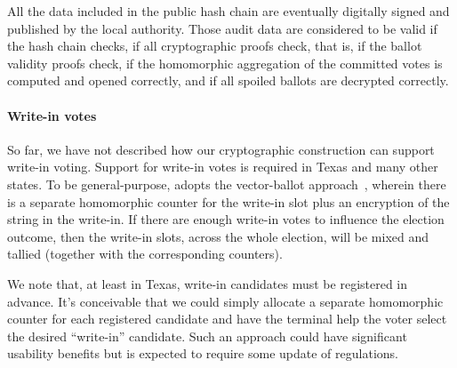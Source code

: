 All the data included in the public hash chain are eventually
digitally signed and published by the local authority. Those audit
data are considered to be valid if the hash chain checks, if all
cryptographic proofs check, that is, if the ballot validity proofs
check, if the homomorphic aggregation of the committed votes is
computed and opened correctly, and if all spoiled ballots are
decrypted correctly.

\paragraph{Write-in votes}
So far, we have not described how our cryptographic construction can
support write-in voting. Support for write-in votes is required in
Texas and many other states. To be general-purpose, \projname adopts
the vector-ballot approach~\cite{kiayias04vectorBallot}, wherein there
is a separate homomorphic counter for the write-in slot plus an
encryption of the string in the write-in. If there are enough write-in
votes to influence the election outcome, then the write-in slots,
across the whole election, will be mixed and tallied (together with
the corresponding counters).

We note that, at least in Texas, write-in candidates must be
registered in advance. It's conceivable that we could simply allocate
a separate homomorphic counter for each registered candidate and have
the \projname terminal help the voter select the desired ``write-in''
candidate. Such an approach could have significant usability benefits
but is expected to require some update of regulations.

